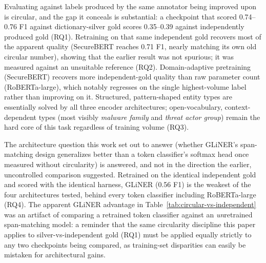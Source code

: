 \documentclass[11pt]{article}
\begin{document}
Evaluating against labels produced by the same annotator being improved
upon is circular, and the gap it conceals is substantial: a checkpoint that
scored 0.74--0.76 F1 against dictionary-silver gold scores 0.35--0.39
against independently produced gold (RQ1). Retraining on that same
independent gold recovers most of the apparent quality (SecureBERT reaches
0.71 F1, nearly matching its own old circular number), showing that the
earlier result was not spurious; it was measured against an unsuitable
reference (RQ2). Domain-adaptive pretraining (SecureBERT) recovers more
independent-gold quality than raw parameter count (RoBERTa-large), which
notably regresses on the single highest-volume label rather than improving
on it. Structured, pattern-shaped entity types are essentially solved by
all three encoder architectures; open-vocabulary, context-dependent
types (most visibly \emph{malware family} and \emph{threat actor
group}) remain the hard core of this task regardless of training volume
(RQ3).

The architecture question this work set out to answer (whether GLiNER's
span-matching design generalizes better than a token classifier's softmax
head once measured without circularity) is answered, and not in the
direction the earlier, uncontrolled comparison suggested.
Retrained on the identical independent gold and scored with the identical
harness, GLiNER (0.56 F1) is the weakest of the four architectures tested,
behind every token classifier including RoBERTa-large (RQ4). The apparent
GLiNER advantage in Table~\ref{tab:circular-vs-independent} was an artifact
of comparing a retrained token classifier against an \emph{un}retrained
span-matching model: a reminder that the same circularity discipline this
paper applies to silver-vs-independent gold (RQ1) must be applied equally
strictly to any two checkpoints being compared, as training-set disparities
can easily be mistaken for architectural gains.
\end{document}
